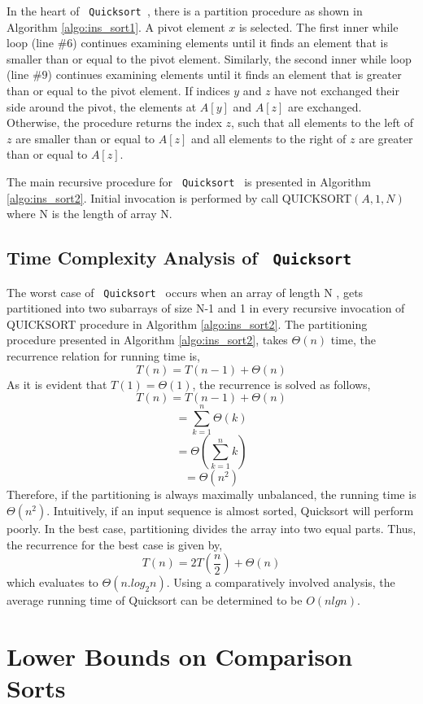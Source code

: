 \documentclass[letter,11pt,twocolumn]{article}
\begin{document}
In the heart of \texttt{ Quicksort }, there is a partition
procedure as shown in Algorithm \ref{algo:ins_sort1}. A pivot element $x$ is selected. The first inner while loop (line $\#6$) continues examining elements until it finds an element that is smaller than or equal to the pivot element. Similarly, the second inner while loop (line $\#9$) continues examining elements until it finds an element that is greater than or equal to the pivot element. If indices $y$ and $z$ have not exchanged their side around the pivot, the elements at $A[y]$ and $A[z]$ are exchanged. Otherwise, the procedure returns the index $z$, such that all elements to the left of $z$ are smaller than or equal to $A[z]$ and all
elements to the right of $z$ are greater than or equal to $A[z]$.

The main recursive procedure for \texttt{ Quicksort } is presented in Algorithm \ref{algo:ins_sort2}. Initial invocation is performed by call QUICKSORT$(A, 1, N )$ where N is
the length of array N.

\subsection{Time Complexity Analysis of \texttt{ Quicksort }}

The worst case of \texttt{ Quicksort } occurs when an array of length N , gets partitioned into two subarrays
of size N-1 and 1 in every recursive invocation of
QUICKSORT procedure in Algorithm \ref{algo:ins_sort2}. The partitioning procedure presented in Algorithm \ref{algo:ins_sort2}, takes
$\Theta(n)$ time, the recurrence relation for running time
is,$$T(n) = T(n-1) + \Theta(n)$$
As it is evident that $T (1) = \Theta(1)$, the recurrence is solved as follows,$$T(n) = T(n-1) + \Theta(n)$$
$$=  \sum_{k=1}^{n} \Theta(k) $$
$$= \Theta(\sum_{k=1}^{n} k)$$
$$= \Theta(n^2)$$
Therefore, if the partitioning is always maximally unbalanced,
the running time is $\Theta(n^2)$. Intuitively, if an input sequence is almost sorted, Quicksort will perform poorly. In the best case, partitioning divides the array into two equal parts. Thus, the recurrence for the best case is given by,$$T(n) = 2T(\frac{n}{2}) + \Theta(n) $$
which evaluates to $\Theta(n.log_2n)$. Using a comparatively involved analysis, the average running time of Quicksort can be determined to be $O(n lg n)$.

\section{Lower Bounds on Comparison Sorts}
\end{document}
